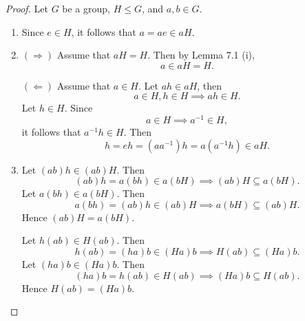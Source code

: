 \documentclass{article}
\theoremstyle{definition}
\begin{document}
     \begin{proof}
     Let $G$ be a group, $H \leq G$, and $a,b \in G$.
         \begin{enumerate}[label=(\roman*)]
             \item Since $e \in H$, it follows that $a = ae \in aH$.
             
             \item $(\Rightarrow)$ Assume that $aH = H$. Then by Lemma 7.1 (i),
             \begin{equation*}
                 a \in aH = H.
             \end{equation*}
             
             $(\Leftarrow)$ Assume that $a \in H$. Let $ah \in aH$, then
             \begin{equation*}
                 a \in H, h \in H \implies ah \in H.
             \end{equation*}
             Let $h \in H$. Since
             \begin{equation*}
                 a \in H \implies a^{-1} \in H,
             \end{equation*}
             it follows that $a^{-1}h \in H$. Then
             \begin{equation*}
                 h = eh = (aa^{-1})h = a(a^{-1}h) \in aH.
             \end{equation*}
             
             \item Let $(ab)h \in (ab)H$. Then
             \begin{equation*}
                 (ab)h = a(bh) \in a(bH) \implies (ab)H \subseteq a(bH).
             \end{equation*}
             Let $a(bh) \in a(bH)$. Then
             \begin{equation*}
                 a(bh) = (ab)h \in (ab)H \implies a(bH) \subseteq (ab)H.
             \end{equation*}
             Hence $(ab)H = a(bH)$.
             
             Let $h(ab) \in H(ab)$. Then
             \begin{equation*}
                 h(ab) = (ha)b \in (Ha)b \implies H(ab) \subseteq (Ha)b.
             \end{equation*}
             Let $(ha)b \in (Ha)b$. Then
             \begin{equation*}
                 (ha)b = h(ab) \in H(ab) \implies (Ha)b \subseteq H(ab).
             \end{equation*}
             Hence $H(ab)=(Ha)b$.
             

\end{enumerate}
\end{proof}
\end{document}
